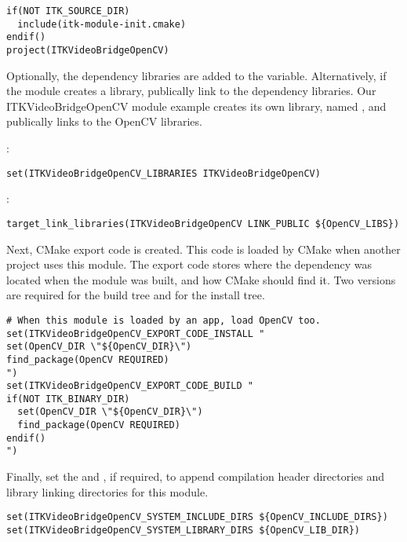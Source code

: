 \begin{verbatim}
if(NOT ITK_SOURCE_DIR)
  include(itk-module-init.cmake)
endif()
project(ITKVideoBridgeOpenCV)
\end{verbatim}

Optionally, the dependency libraries are added to the
 variable. Alternatively, if the module creates
a library, publically link to the dependency libraries. Our
ITKVideoBridgeOpenCV module example creates its own library, named
, and publically links to the OpenCV libraries.

:
\begin{verbatim}
set(ITKVideoBridgeOpenCV_LIBRARIES ITKVideoBridgeOpenCV)
\end{verbatim}

:
\begin{verbatim}
target_link_libraries(ITKVideoBridgeOpenCV LINK_PUBLIC ${OpenCV_LIBS})
\end{verbatim}

Next, CMake export code is created. This code is loaded by CMake when another
project uses this module. The export code stores where the dependency was
located when the module was built, and how CMake should find it. Two versions
are required for the build tree and for the install tree.

\begin{verbatim}
# When this module is loaded by an app, load OpenCV too.
set(ITKVideoBridgeOpenCV_EXPORT_CODE_INSTALL "
set(OpenCV_DIR \"${OpenCV_DIR}\")
find_package(OpenCV REQUIRED)
")
set(ITKVideoBridgeOpenCV_EXPORT_CODE_BUILD "
if(NOT ITK_BINARY_DIR)
  set(OpenCV_DIR \"${OpenCV_DIR}\")
  find_package(OpenCV REQUIRED)
endif()
")
\end{verbatim}

Finally, set the  and
, if required, to append
compilation header directories and library linking directories for this
module.

\begin{verbatim}
set(ITKVideoBridgeOpenCV_SYSTEM_INCLUDE_DIRS ${OpenCV_INCLUDE_DIRS})
set(ITKVideoBridgeOpenCV_SYSTEM_LIBRARY_DIRS ${OpenCV_LIB_DIR})
\end{verbatim}

